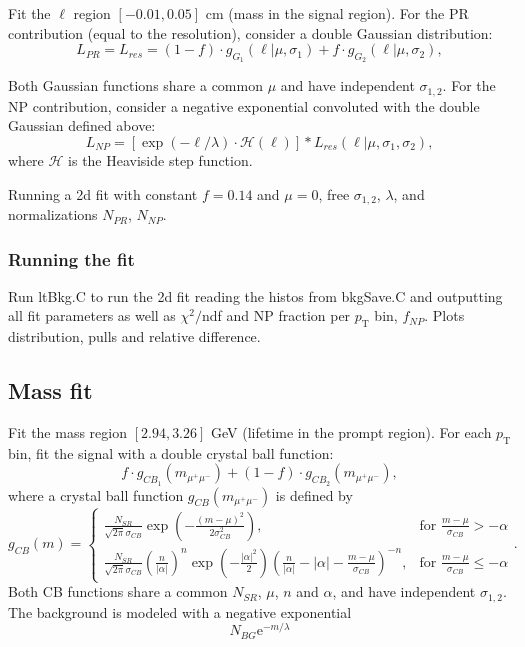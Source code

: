 \documentclass{article}
\newcommand{\pt}{p_\text{T}}
\begin{document}
Fit the $\ell$ region $[-0.01,0.05]$ cm (mass in the signal region). For the PR contribution (equal to the resolution), consider a double Gaussian distribution:
\begin{equation}
L_{PR}=L_{res} = (1-f)\cdot g_{G_1}(\ell|\mu, \sigma_1)+f\cdot g_{G_2}(\ell|\mu, \sigma_2),
\end{equation}

Both Gaussian functions share a common $\mu$ and have independent $\sigma_{1,2}$. For the NP contribution, consider a negative exponential convoluted with the double Gaussian defined above:
\begin{equation}
L_{NP}=	\left[\exp(-\ell/\lambda)\cdot\mathcal{H}(\ell)\right]*L_{res}(\ell|\mu, \sigma_1,\sigma_2),
\end{equation}
where $\mathcal{H}$ is the Heaviside step function.

Running a 2d fit with constant $f=0.14$ and $\mu=0$, free $\sigma_{1,2}$, $\lambda$, and normalizations $N_{PR}$, $N_{NP}$.

\subsubsection{Running the fit}

Run ltBkg.C to run the 2d fit reading the histos from bkgSave.C and outputting all fit parameters as well as $\chi^2/$ndf and NP fraction per $\pt$ bin, $f_{NP}$. Plots distribution, pulls and relative difference.

\subsection{Mass fit}

Fit the mass region $[2.94, 3.26]$ GeV (lifetime in the prompt region). For each $\pt$ bin, fit the signal with a double crystal ball function:
\begin{equation}
f\cdot g_{CB_1}(m_{\mu^+\mu^-})+(1-f)\cdot g_{CB_2}(m_{\mu^+\mu^-}),
\end{equation}
where a crystal ball function $g_{CB}(m_{\mu^+\mu^-})$ is defined by
\begin{equation}
g_{CB}(m) = \begin{cases}
\frac{N_{SR}}{\sqrt{2\pi}\sigma_{CB}}\exp\left(-\frac{(m-\mu)^2}{2\sigma^2_{CB}}\right), & \text{for }\frac{m-\mu}{\sigma_{CB}} > -\alpha \\
\frac{N_{SR}}{\sqrt{2\pi}\sigma_{CB}}\left(\frac{n}{|\alpha|}\right)^n\exp\left(-\frac{|\alpha|^2}{2}\right)\left(\frac{n}{|\alpha|}-|\alpha|-\frac{m-\mu}{\sigma_{CB}}\right)^{-n}, & \text{for }\frac{m-\mu}{\sigma_{CB}}\leq-\alpha
\end{cases}.
\end{equation}
Both CB functions share a common $N_{SR}$, $\mu$, $n$ and $\alpha$, and have independent $\sigma_{1,2}$. The background is modeled with a negative exponential
\begin{equation}
N_{BG} \text{e}^{- m / \lambda}
\end{equation}
\end{document}
